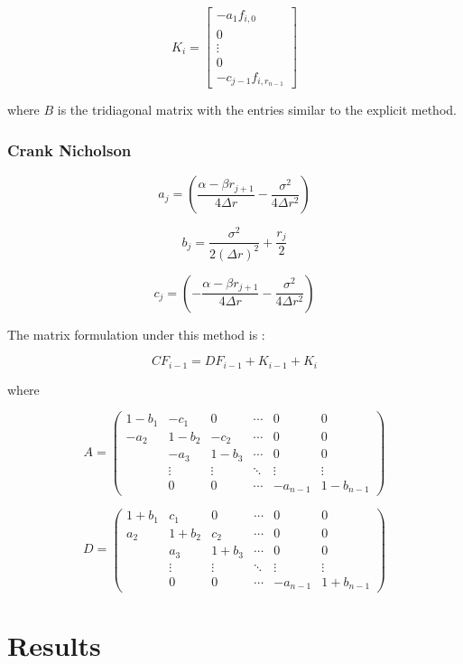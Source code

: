 \documentclass[12pt,a4paper]{article}
\begin{document}
$$K_{i}= \begin{bmatrix}
-a_{1}f_{i,0} \\
0 \\
\vdots \\
0 \\
-c_{j-1}f_{i, r_{n-1}}
\end{bmatrix}  $$

where $B$ is the tridiagonal matrix with the entries similar to the explicit method.

\subsubsection{Crank Nicholson}

$$a_{j}=(\frac{\alpha-\beta r_{j+1}}{4\Delta r} - \frac{\sigma^2}{4\Delta r^2}) $$

$$b_{j}= \frac{\sigma^2}{2 (\Delta r)^2}+\frac{r_{j}}{2}$$

$$c_{j}=(-\frac{\alpha-\beta r_{j+1}}{4\Delta r} - \frac{\sigma^2}{4\Delta r^2}) $$

The matrix formulation under this method is :

$$CF_{i-1}=DF_{i-1}+K_{i-1}+K_{i}$$

where

$$ A= \left( \begin{array}{cccccc}
1-b_{1} & -c_{1} & 0 & \cdots  & 0 & 0\\
-a_{2} & 1-b_{2} & -c_{2} &\cdots & 0 & 0 \\
& -a_{3} & 1-b_{3} & \cdots & 0 & 0  \\
& \vdots &\vdots & \ddots & \vdots & \vdots \\ 
& 0 & 0 & \cdots & -a_{n-1} & 1-b_{n-1} \end{array} \right) $$

$$ D= \left( \begin{array}{cccccc}
1+b_{1} & c_{1} & 0 & \cdots  & 0 & 0\\
a_{2} & 1+b_{2} & c_{2} &\cdots & 0 & 0 \\
& a_{3} & 1+b_{3} & \cdots & 0 & 0  \\
& \vdots &\vdots & \ddots & \vdots & \vdots \\ 
& 0 & 0 & \cdots & -a_{n-1} & 1+b_{n-1} \end{array} \right) $$
	
	\newpage
	\section{Results}
	\label{sec: Results}
	
\end{document}
